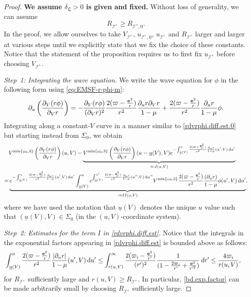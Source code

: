 \documentclass[10pt, reqno]{amsart}
\theoremstyle{definition}
\theoremstyle{remark}
\theoremstyle{conjecture}
\numberwithin{equation}{section}
\newcommand{\ud}{\mathrm{d}}
\newcommand{\rd}{\partial}
\newcommand{\0}{\emptyset}
\newcommand{\omg}{\omega}
\newcommand{\bfe}{{\bf e}}
\newcommand{\calI}{\mathcal I}
\newcommand{\f}{\frac}
\newcommand{\de}{\delta}
\newcommand{\pfstep}[1]{\vspace{.5em} {\it \noindent #1.}}
\newcommand{\e}{\bfe}							%
\newcommand{\NI}{\calI^{+}}						%
\begin{document}
\begin{proof}
\textbf{We assume $\de_{\mathfrak L}>0$ is given and fixed.} Without loss of generality, we can assume 
\begin{equation}\label{contra.unif.large.V.2}
R_{\calI^+}\geq R_{\NI,0}. 
\end{equation}
In the proof, we allow ourselves to take $V_{\calI^+}$, $u_{\calI^+,0}$, $u_{\calI^+}$ and $R_{\calI^+}$ larger and larger at various steps until we explicitly state that we fix the choice of these constants. Notice that the statement of the proposition requires us to first fix $u_{\calI^+}$ before choosing $V_{\calI^+}$.

\pfstep{Step~1: Integrating the wave equation}
We write the wave equation for $\phi$ in the following form using \eqref{eq:EMSF-r-phi-m}:
$$\rd_u\left(\f{\rd_V(r\phi)}{\rd_V r}\right) = -\f{\rd_V(r\phi)}{(\rd_V r)^2} \frac{2(\varpi - \frac{\e^{2}}{r})}{r^{2}} \frac{\rd_{u} r \rd_{V} r}{1-\mu} + \frac{2(\varpi - \frac{\e^{2}}{r})}{r^{2}} \frac{\rd_{u} r}{1-\mu}\phi.$$
Integrating along a constant-$V$ curve in a manner similar to \eqref{rdvrphi.diff.est.0} but starting instead from $\Sigma_0$, we obtain
\begin{equation}\label{rdvrphi.diff.est}
\begin{split}
&V^{\min\{\omg_0,3\}}\left(\f{\rd_V(r\phi)}{\rd_V r}\right)(u,V)
-\underbrace{V^{\min\{\omg_0,3\}}\left(\f{\rd_V(r\phi)}{\rd_V r}\right)(u=\underline{u}(V),V)e^{-\int_{\underline{u}(V)}^u \frac{2(\varpi - \frac{\e^{2}}{r})}{r^{2}} \frac{\rd_{u} r }{1-\mu}(u',V) \, \ud u'}}_{=:I(u,V)}\\
= & \underbrace{e^{-\int_{\underline{u}(V)}^u \frac{2(\varpi - \frac{\e^{2}}{r})}{r^{2}} \frac{\rd_{u} r }{1-\mu}(u',V) \, \ud u'}\int_{\underline{u}(V)}^u e^{\int_{\underline{u}(V)}^{u'} \frac{2(\varpi - \frac{\e^{2}}{r})}{r^{2}} \frac{\rd_{u} r }{1-\mu}(u'',V) \, \ud u''} V^{\min\{\omg_0,3\}}\frac{2(\varpi - \frac{\e^{2}}{r})}{r^{2}} \frac{(\rd_{u} r)}{1-\mu}\phi(u',V) \, \ud u'}_{:=II(u,V)},
\end{split}
\end{equation} 
where we have used the notation that $\underline{u}(V)$ denotes the unique $u$ value such that $(\underline{u}(V),V)\in \Sigma_0$ (in the $(u,V)$-coordinate system).

\pfstep{Step~2: Estimates for the term $I$ in \eqref{rdvrphi.diff.est}}
Notice that the integrals in the exponential factors appearing in \eqref{rdvrphi.diff.est} is bounded above as follows:
\begin{equation}\label{bd.exp.factor}
\begin{split}
&\int_{\underline{u}(V)}^u \frac{2(\varpi - \frac{\e^{2}}{r})}{r^{2}} \frac{|\rd_{u} r| }{1-\mu}(u',V) \, \ud u'
\leq  \int_{r(u,V)}^{\infty} \frac{2(\varpi_{i} - \frac{\e^{2}}{r'})}{(r')^{2}} \frac{1 }{(1-\f{2\varpi_{i}}{r'}+\f{{\bf e}^2}{r'^2})} \, dr'\leq \f{4\varpi_i}{r(u,V)},
\end{split}
\end{equation}
for $R_{\mathcal I^+}$ sufficiently large and $r(u,V)\geq R_{\mathcal I^+}$. In particular, \eqref{bd.exp.factor} can be made arbitrarily small by choosing $R_{\mathcal I^+}$ sufficiently large.


\end{proof}
\end{document}
